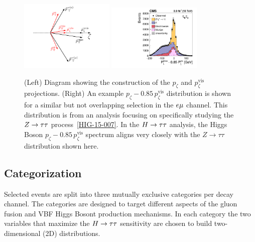 \begin{figure}[htbp]
\centering
     \includegraphics[width=0.4\textwidth]{higgs_to_taus/plots/pZeta_def.pdf}
     \includegraphics[width=0.4\textwidth]{higgs_to_taus/plots/htt_em_pZeta.pdf}\\
     \caption{
(Left) Diagram showing the construction of the $p_\zeta$ and $p_\zeta^{\text{vis}}$ projections.
(Right) An example $p_\zeta - 0.85 \, p_\zeta^{\text{vis}}$ distribution is shown for a similar but not
overlapping selection in the $e\mu$ channel.  This distribution is from an analysis focusing on specifically studying the
$Z\to\tau\tau$ process~\ref{HIG-15-007}.
In the $H\to\tau\tau$ analysis, the Higgs Boson $p_\zeta - 0.85 \, p_\zeta^{\text{vis}}$
spectrum aligns very closely with the $Z\to\tau\tau$ distribution shown here.
     }
     \label{fig:htt_pZeta}
\end{figure}

\subsection{Categorization}

Selected events are split into three mutually exclusive categories per decay channel.
The categories are designed to target different aspects of the gluon fusion and VBF Higgs Bosont production mechanisms.
In each category the two variables that maximize the $H\to\tau\tau$ sensitivity are chosen to build 
two-dimensional (2D) distributions.

